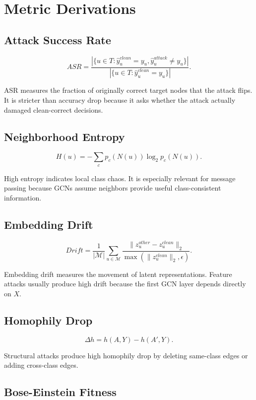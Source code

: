 \documentclass[12pt,oneside]{report}
\begin{document}
\section{Metric Derivations}
\subsection{Attack Success Rate}

$$
ASR=\frac{|\{u\in T:\hat{y}^{clean}_u=y_u,\hat{y}^{attack}_u\neq y_u\}|}{|\{u\in T:\hat{y}^{clean}_u=y_u\}|}.
$$

ASR measures the fraction of originally correct target nodes that the attack flips. It is stricter than accuracy drop because it asks whether the attack actually damaged clean-correct decisions.

\subsection{Neighborhood Entropy}

$$
H(u)=-\sum_c p_c(N(u))\log_2p_c(N(u)).
$$

High entropy indicates local class chaos. It is especially relevant for message passing because GCNs assume neighbors provide useful class-consistent information.

\subsection{Embedding Drift}

$$
Drift=\frac{1}{|\mathcal{M}|}\sum_{u\in\mathcal{M}}\frac{\|z_u^{other}-z_u^{clean}\|_2}{\max(\|z_u^{clean}\|_2,\epsilon)}.
$$

Embedding drift measures the movement of latent representations. Feature attacks usually produce high drift because the first GCN layer depends directly on $X$.

\subsection{Homophily Drop}

$$
\Delta h=h(A,Y)-h(A',Y).
$$

Structural attacks produce high homophily drop by deleting same-class edges or adding cross-class edges.

\subsection{Bose-Einstein Fitness}
\end{document}
